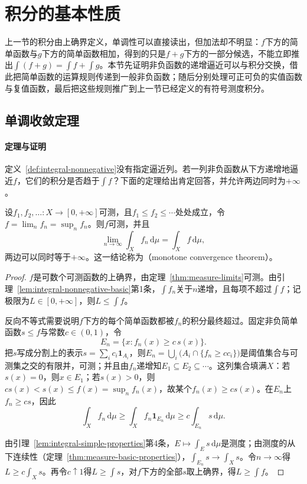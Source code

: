 \section{积分的基本性质}
\label{sec:integral-properties}

上一节的积分由上确界定义，单调性可以直接读出，但加法却不明显：$f$下方的简单函数与$g$下方的简单函数相加，得到的只是$f+g$下方的一部分候选，不能立即推出$\int(f+g)=\int f+\int g$。本节先证明非负函数的递增逼近可以与积分交换，借此把简单函数的运算规则传递到一般非负函数；随后分别处理可正可负的实值函数与复值函数，最后把这些规则推广到上一节已经定义的有符号测度积分。

\subsection{单调收敛定理}
\label{sec:integral-mct}

\paragraph{定理与证明}
定义~\ref{def:integral-nonnegative}没有指定逼近列。若一列非负函数从下方递增地逼近$f$，它们的积分是否趋于$\int f$？下面的定理给出肯定回答，并允许两边同时为$+\infty$。

\begin{theorem}[单调收敛定理]
\label{thm:integral-monotone-convergence}
设$f_1,f_2,\dots:X\to[0,+\infty]$可测，且$f_1\le f_2\le\cdots$处处成立，令$f=\lim_nf_n=\sup_nf_n$。则$f$可测，并且
\[
 \lim_{n\to\infty}\int_Xf_n\,\mathrm d\mu=\int_Xf\,\mathrm d\mu,
\]
两边可以同时等于$+\infty$。这一结论称为（monotone convergence theorem）。
\end{theorem}

\begin{proof}
$f$是可数个可测函数的上确界，由定理~\ref{thm:measure-limits}可测。由引理~\ref{lem:integral-nonnegative-basic}第1条，$\int f_n$关于$n$递增，且每项不超过$\int f$；记极限为$L\in[0,+\infty]$，则$L\le\int f$。

反向不等式需要说明$f$下方的每个简单函数都被$f_n$的积分最终超过。固定非负简单函数$s\le f$与常数$c\in(0,1)$，令
\[
 E_n=\{x:f_n(x)\ge c\,s(x)\}.
\]
把$s$写成分割上的表示$s=\sum_ic_i\mathbf 1_{A_i}$，则$E_n=\bigcup_i\bigl(A_i\cap\{f_n\ge cc_i\}\bigr)$是阈值集合与可测集之交的有限并，可测；并且由$f_n$递增知$E_1\subseteq E_2\subseteq\cdots$。这列集合填满$X$：若$s(x)=0$，则$x\in E_1$；若$s(x)>0$，则$cs(x)<s(x)\le f(x)=\sup_nf_n(x)$，故某个$f_n(x)\ge cs(x)$。在$E_n$上$f_n\ge cs$，因此
\[
 \int_Xf_n\,\mathrm d\mu\ge\int_Xf_n\mathbf 1_{E_n}\,\mathrm d\mu\ge c\int_{E_n}s\,\mathrm d\mu.
\]

由引理~\ref{lem:integral-simple-properties}第4条，$E\mapsto\int_Es\,\mathrm d\mu$是测度；由测度的从下连续性（定理~\ref{thm:measure-basic-properties}），$\int_{E_n}s\to\int_Xs$。令$n\to\infty$得$L\ge c\int_Xs$。再令$c\uparrow1$得$L\ge\int s$，对$f$下方的全部$s$取上确界，得$L\ge\int f$。
\end{proof}

